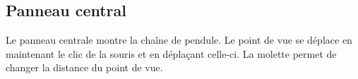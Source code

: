 \subsection{Panneau central}
%
Le panneau centrale montre la chaîne de pendule. Le point de vue se déplace en maintenant le clic de la souris et en déplaçant celle-ci. La molette permet de changer la distance du point de vue.
%
%
